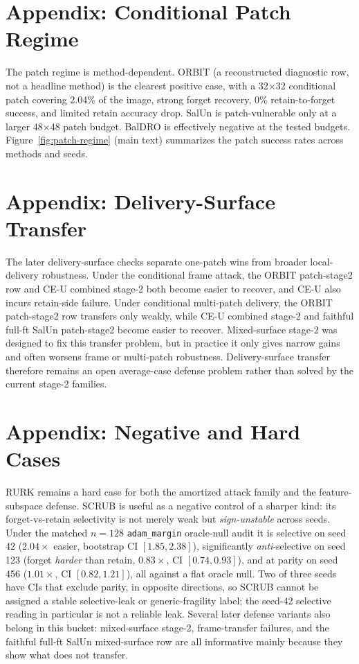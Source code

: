 \documentclass{article}
\begin{document}
\section{Appendix: Conditional Patch Regime}
The patch regime is method-dependent. ORBIT (a reconstructed diagnostic row, not a headline method) is the clearest positive case, with a 32$\times$32 conditional patch covering 2.04\% of the image, strong forget recovery, 0\% retain-to-forget success, and limited retain accuracy drop. SalUn is patch-vulnerable only at a larger 48$\times$48 patch budget. BalDRO is effectively negative at the tested budgets. Figure~\ref{fig:patch-regime} (main text) summarizes the patch success rates across methods and seeds.

\section{Appendix: Delivery-Surface Transfer}
The later delivery-surface checks separate one-patch wins from broader local-delivery robustness. Under the conditional frame attack, the ORBIT patch-stage2 row and CE-U combined stage-2 both become easier to recover, and CE-U also incurs retain-side failure. Under conditional multi-patch delivery, the ORBIT patch-stage2 row transfers only weakly, while CE-U combined stage-2 and faithful full-ft SalUn patch-stage2 become easier to recover. Mixed-surface stage-2 was designed to fix this transfer problem, but in practice it only gives narrow gains and often worsens frame or multi-patch robustness. Delivery-surface transfer therefore remains an open average-case defense problem rather than solved by the current stage-2 families.

\section{Appendix: Negative and Hard Cases}
RURK remains a hard case for both the amortized attack family and the feature-subspace defense. SCRUB is useful as a negative control of a sharper kind: its forget-vs-retain selectivity is not merely weak but \emph{sign-unstable} across seeds. Under the matched $n{=}128$ \texttt{adam\_margin} oracle-null audit it is selective on seed 42 ($2.04\times$ easier, bootstrap CI $[1.85,2.38]$), significantly \emph{anti}-selective on seed 123 (forget \emph{harder} than retain, $0.83\times$, CI $[0.74,0.93]$), and at parity on seed 456 ($1.01\times$, CI $[0.82,1.21]$), all against a flat oracle null. Two of three seeds have CIs that exclude parity, in opposite directions, so SCRUB cannot be assigned a stable selective-leak or generic-fragility label; the seed-42 selective reading in particular is not a reliable leak. Several later defense variants also belong in this bucket: mixed-surface stage-2, frame-transfer failures, and the faithful full-ft SalUn mixed-surface row are all informative mainly because they show what does not transfer.
\end{document}

